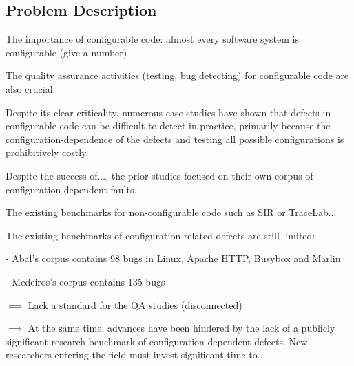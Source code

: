 \subsection{Problem Description}
\label{problem-description}

The importance of configurable code: almost every software system is configurable (give a number)

The quality assurance activities (testing, bug detecting) for configurable code are also crucial.

Despite its clear criticality, numerous case studies have shown that defects in configurable code 
can be difficult to detect in practice, primarily because the configuration-dependence of the 
defects and testing all possible configurations is prohibitively costly.

Despite the success of..., the prior studies focused on their own corpus of configuration-dependent faults.

The existing benchmarks for non-configurable code such as SIR or TraceLab...

The existing benchmarks of configuration-related defects are still limited:

- Abal's corpus contains 98 bugs in Linux, Apache HTTP, Busybox and Marlin

- Medeiros's corpus contains 135 bugs

$\implies$ Lack a standard for the QA studies (disconnected)

$\implies$ At the same time, advances have been hindered by the lack of a publicly significant research 
benchmark of configuration-dependent defects. New researchers entering the field must invest significant time to...
